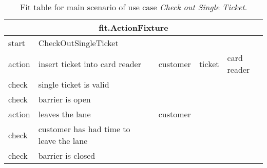 \begin{table}[H]
\begin{centering}
\begin{tabular}{|l|l|l|l|l|}
\hline  \multicolumn{5}{|c|}{fit.ActionFixture} \\
\hline start & \multicolumn{1}{l}{CheckOutSingleTicket} &  \multicolumn{3}{l|}{}  \\ 
\hline action & insert ticket into card reader & customer & ticket  & card reader \\ 
\hline check & \multicolumn{1}{l}{single ticket is valid} &  \multicolumn{3}{l|}{}\\ 
\hline check & \multicolumn{1}{l}{barrier is open} &  \multicolumn{3}{l|}{ }   \\ 
\hline action & leaves the lane & \multicolumn{1}{l}{customer} &  \multicolumn{2}{l|}{}  \\
\hline check & \multicolumn{1}{l}{customer has had time to leave the lane} &  \multicolumn{3}{l|}{}   \\ 
\hline check & \multicolumn{1}{l}{barrier is closed} &  \multicolumn{3}{l|}{}   \\ 
\hline
\end{tabular}
\end{centering}
\caption{Fit table for main scenario of use case \emph{Check out Single Ticket}.}
\end{table}